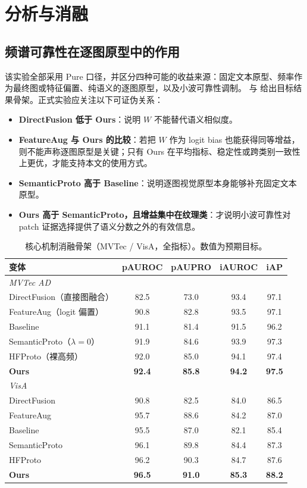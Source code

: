 \section{分析与消融}
\label{sec:analysis}

\subsection{频谱可靠性在逐图原型中的作用}
该实验全部采用 Pure 口径，并区分四种可能的收益来源：固定文本原型、频率作为最终图或特征偏置、纯语义的逐图原型，以及小波可靠性调制。 与  给出目标结果骨架。正式实验应关注以下可证伪关系：
\begin{itemize}[leftmargin=1.4em,itemsep=0.1em,topsep=0.2em]
\item \textbf{DirectFusion 低于 Ours}：说明 $W$ 不能替代语义相似度。
\item \textbf{FeatureAug 与 Ours 的比较}：若把 $W$ 作为 logit bias 也能获得同等增益，则不能声称逐图原型是关键；只有 Ours 在平均指标、稳定性或跨类别一致性上更优，才能支持本文的使用方式。
\item \textbf{SemanticProto 高于 Baseline}：说明逐图视觉原型本身能够补充固定文本原型。
\item \textbf{Ours 高于 SemanticProto，且增益集中在纹理类}：才说明小波可靠性对 patch 证据选择提供了语义分数之外的有效信息。
\end{itemize}

\begin{table}[t]
\centering
\caption{核心机制消融骨架（MVTec / VisA，全指标）。数值为预期目标。}
\label{tab:ablation}
\small
\setlength{\tabcolsep}{4pt}
\begin{tabular}{lcccc}
\toprule
变体 & pAUROC & pAUPRO & iAUROC & iAP \\
\midrule
\multicolumn{5}{l}{\emph{MVTec AD}}\\
DirectFusion（直接图融合） & 82.5 & 73.0 & 93.4 & 97.1 \\
FeatureAug（logit 偏置） & 90.8 & 82.8 & 93.5 & 97.1 \\
Baseline & 91.1 & 81.4 & 91.5 & 96.2 \\
SemanticProto（$\lambda=0$） & 91.9 & 84.6 & 93.9 & 97.3 \\
HFProto（裸高频） & 92.0 & 85.0 & 94.1 & 97.4 \\
\textbf{Ours} & \textbf{92.4} & \textbf{85.8} & \textbf{94.2} & \textbf{97.5} \\
\midrule
\multicolumn{5}{l}{\emph{VisA}}\\
DirectFusion & 90.8 & 82.5 & 84.0 & 86.5 \\
FeatureAug & 95.7 & 88.6 & 84.2 & 87.0 \\
Baseline & 95.5 & 87.0 & 82.1 & 85.4 \\
SemanticProto & 96.1 & 89.8 & 84.4 & 87.3 \\
HFProto & 96.2 & 90.3 & 84.7 & 87.6 \\
\textbf{Ours} & \textbf{96.5} & \textbf{91.0} & \textbf{85.3} & \textbf{88.2} \\
\bottomrule
\end{tabular}
\end{table}

